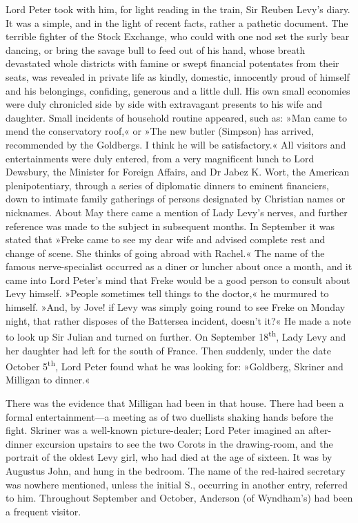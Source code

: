 Lord Peter took with him, for light reading in the train, Sir Reuben Levy's diary. It was a simple, and in the light of recent facts, rather a pathetic document. The terrible fighter of the Stock Exchange, who could with one nod set the surly bear dancing, or bring the savage bull to feed out of his hand, whose breath devastated whole districts with famine or swept financial potentates from their seats, was revealed in private life as kindly, domestic, innocently proud of himself and his belongings, confiding, generous and a little dull. His own small economies were duly chronicled side by side with extravagant presents to his wife and daughter. Small incidents of household routine appeared, such as: »Man came to mend the conservatory roof,« or »The new butler (Simpson) has arrived, recommended by the Goldbergs. I think he will be satisfactory.« All visitors and entertainments were duly entered, from a very magnificent lunch to Lord Dewsbury, the Minister for Foreign Affairs, and Dr Jabez K. Wort, the American plenipotentiary, through a series of diplomatic dinners to eminent financiers, down to intimate family gatherings of persons designated by Christian names or nicknames. About May there came a mention of Lady Levy's nerves, and further reference was made to the subject in subsequent months. In September it was stated that »Freke came to see my dear wife and advised complete rest and change of scene. She thinks of going abroad with Rachel.« The name of the famous nerve-specialist occurred as a diner or luncher about once a month, and it came into Lord Peter's mind that Freke would be a good person to consult about Levy himself. »People sometimes tell things to the doctor,« he murmured to himself. »And, by Jove! if Levy was simply going round to see Freke on Monday night, that rather disposes of the Battersea incident, doesn't it?« He made a note to look up Sir Julian and turned on further. On September 18\textsuperscript{th}, Lady Levy and her daughter had left for the south of France. Then suddenly, under the date October 5\textsuperscript{th}, Lord Peter found what he was looking for: »Goldberg, Skriner and Milligan to dinner.«

There was the evidence that Milligan had been in that house. There had been a formal entertainment\allowbreak---\allowbreak a meeting as of two duellists shaking hands before the fight. Skriner was a well-known picture-dealer; Lord Peter imagined an after-dinner excursion upstairs to see the two Corots in the drawing-room, and the portrait of the oldest Levy girl, who had died at the age of sixteen. It was by Augustus John, and hung in the bedroom. The name of the red-haired secretary was nowhere mentioned, unless the initial S., occurring in another entry, referred to him. Throughout September and October, Anderson (of Wyndham's) had been a frequent visitor.

